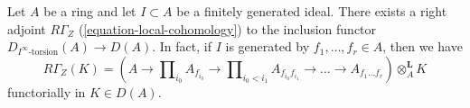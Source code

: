 \begin{lemma}
\label{lemma-local-cohomology-adjoint}
Let $A$ be a ring and let $I \subset A$ be a finitely generated ideal.
There exists a right adjoint $R\Gamma_Z$ (\ref{equation-local-cohomology})
to the inclusion functor $D_{I^\infty\text{-torsion}}(A) \to D(A)$.
In fact, if $I$ is generated by $f_1, \ldots, f_r \in A$, then we have
$$
R\Gamma_Z(K) =
(A \to \prod\nolimits_{i_0} A_{f_{i_0}} \to
\prod\nolimits_{i_0 < i_1} A_{f_{i_0}f_{i_1}}
\to \ldots \to A_{f_1\ldots f_r}) \otimes_A^\mathbf{L} K
$$
functorially in $K \in D(A)$.
\end{lemma}
